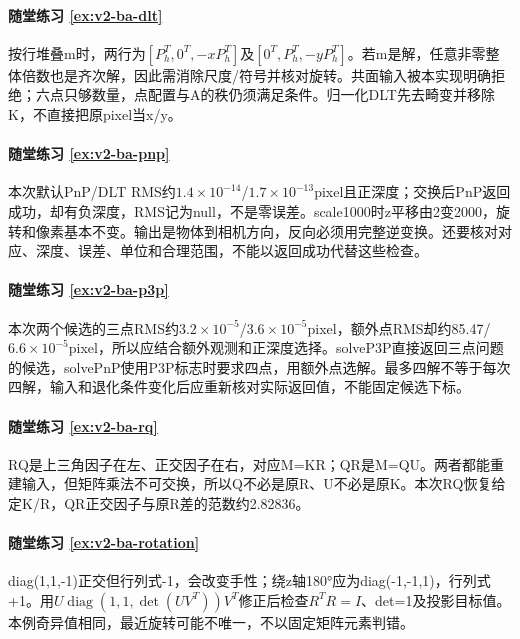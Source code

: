 \paragraph*{随堂练习 \ref{ex:v2-ba-dlt}}
\begin{solution}
按行堆叠m时，两行为$[P_h^T,0^T,-xP_h^T]$及$[0^T,P_h^T,-yP_h^T]$。若m是解，任意非零整体倍数也是齐次解，因此需消除尺度/符号并核对旋转。共面输入被本实现明确拒绝；六点只够数量，点配置与A的秩仍须满足条件。归一化DLT先去畸变并移除K，不直接把原pixel当x/y。
\end{solution}

\paragraph*{随堂练习 \ref{ex:v2-ba-pnp}}
\begin{solution}
本次默认PnP/DLT RMS约$1.4\times10^{-14}$/$1.7\times10^{-13}$pixel且正深度；交换后PnP返回成功，却有负深度，RMS记为null，不是零误差。scale1000时z平移由2变2000，旋转和像素基本不变。输出是物体到相机方向，反向必须用完整逆变换。还要核对对应、深度、误差、单位和合理范围，不能以返回成功代替这些检查。
\end{solution}

\paragraph*{随堂练习 \ref{ex:v2-ba-p3p}}
\begin{solution}
本次两个候选的三点RMS约$3.2\times10^{-5}$/$3.6\times10^{-5}$pixel，额外点RMS却约85.47/$6.6\times10^{-5}$pixel，所以应结合额外观测和正深度选择。solveP3P直接返回三点问题的候选，solvePnP使用P3P标志时要求四点，用额外点选解。最多四解不等于每次四解，输入和退化条件变化后应重新核对实际返回值，不能固定候选下标。
\end{solution}

\paragraph*{随堂练习 \ref{ex:v2-ba-rq}}
\begin{solution}
RQ是上三角因子在左、正交因子在右，对应M=KR；QR是M=QU。两者都能重建输入，但矩阵乘法不可交换，所以Q不必是原R、U不必是原K。本次RQ恢复给定K/R，QR正交因子与原R差的范数约2.82836。
\end{solution}

\paragraph*{随堂练习 \ref{ex:v2-ba-rotation}}
\begin{solution}
diag(1,1,-1)正交但行列式-1，会改变手性；绕z轴180°应为diag(-1,-1,1)，行列式+1。用$U\operatorname{diag}(1,1,\det(UV^T))V^T$修正后检查$R^TR=I$、det=1及投影目标值。本例奇异值相同，最近旋转可能不唯一，不以固定矩阵元素判错。
\end{solution}

